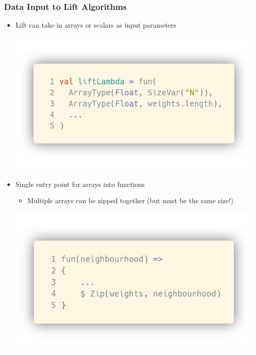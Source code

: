 \documentclass[10pt,usetotalslideindicator]{beamer}
\begin{document}
\begin{frame}
\frametitle{Data Input to Lift Algorithms}
\begin{itemize}
    \item Lift can take in arrays or scalars as input parameters
            \vspace{-1.2cm}
\begin{block}{}
    \begin{center}
    \includegraphics[width=.5\textwidth]{../images/inputData.png}
    \end{center}
\end{block}
    \item Single entry point for arrays into functions  
            \begin{itemize}
                \item Multiple arrays can be zipped together (but must be the same size!) 
            \end{itemize}
            \vspace{-1.5cm}
\begin{block}{}
    \begin{center}
    \includegraphics[width=.5\textwidth]{../images/zippedData.png}
    \end{center}
\end{block}
\end{itemize}
\end{frame}
\end{document}
